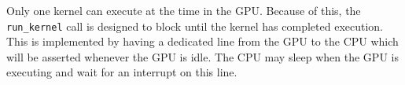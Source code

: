 Only one kernel can execute at the time in the GPU.
Because of this, the \verb/run_kernel/ call is designed to block until the kernel has completed execution.
This is implemented by having a dedicated line from the GPU to the CPU which will be asserted whenever the GPU is idle.
The CPU may sleep when the GPU is executing and wait for an interrupt on this line.
